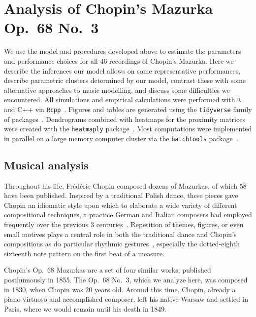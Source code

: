 \documentclass[12pt]{article}
\begin{document}
\section{Analysis of Chopin's Mazurka Op.\ 68 No.\ 3}
\label{sec:analys-chop-mazurka}

We use the model and procedures developed above to estimate the
parameters and performance choices for all 46 recordings of Chopin's
Mazurka. Here we describe the inferences our model allows on some
representative performances, describe parametric clusters determined
by our model, contrast these with some alternative approaches to music
modelling, and discuss some difficulties we encountered. All simulations and empirical calculations were performed with
\texttt{R}~\citep{R-Core-Team2019} and C++ via \texttt{Rcpp}~\citep{Eddelbuettel2013}. Figures and tables are generated
using the \texttt{tidyverse} family of
packages~\citep{Wickham2017, Wickham2016}. Dendrograms combined with
heatmaps for the proximity matrices were created with the
\texttt{heatmaply} package~\citep{GaliliOCallaghan2017}.
Most
computations were implemented in parallel on a
large
memory computer cluster via
the \texttt{batchtools} package~\citep{LangBischl2017}. 

\subsection{Musical analysis}
\label{sec:musical-analysis}

Throughout his life, Fr\'ed\'eric Chopin composed dozens of Mazurkas,
of which 58 have been published. Inspired by a traditional Polish
dance, these pieces gave Chopin an idiomatic style upon which to
elaborate a wide variety of different compositional techniques, a
practice German and Italian composers had employed frequently over the previous 3
centuries~\citep{BurkholderGrout2014}. Repetition of themes, figures, or even small motives plays
a central role in both the traditional dance and Chopin's compositions
as do particular rhythmic gestures~\citep{Kallberg1996}, especially the
dotted-eighth sixteenth note pattern on the first beat of a measure. 

Chopin's Op.\ 68 Mazurkas are a set of four similar works, published
posthumously in 1855. The Op.\ 68 No.\ 3, which we analyze here, was
composed in 1830, when Chopin was 20 years old. Around this time,
Chopin, already a piano virtuoso and accomplished composer, left his
native Warsaw and settled in Paris, where we would remain until his
death in 1849.
\end{document}
